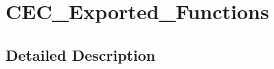 \hypertarget{group___c_e_c___exported___functions}{}\section{C\+E\+C\+\_\+\+Exported\+\_\+\+Functions}
\label{group___c_e_c___exported___functions}


\subsection{Detailed Description}
